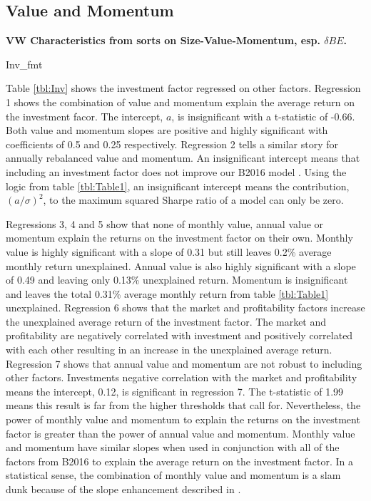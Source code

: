 
\subsection{Value and Momentum}

\textbf{VW Characteristics from sorts on Size-Value-Momentum, esp. $\delta BE$.}

{Inv_fmt}

Table \ref{tbl:Inv} shows the investment factor regressed on other factors. Regression 1
shows the combination of value and momentum explain the average return on the investment
facor. The intercept, $a$, is insignificant with a t-statistic of -0.66. Both value and
momentum slopes are positive and highly significant with coefficients of 0.5 and 0.25
respectively. Regression 2 tells a similar story for annually rebalanced value and
momentum. An insignificant intercept means that including an investment factor does not
improve our B2016 model \parencite{fama1998determining, barillas2016alpha,
fama2016choosing}. Using the logic from table \ref{tbl:Table1}, an insignificant intercept
means the contribution, $(a/\sigma)^2$, to the maximum squared Sharpe ratio of a model can
only be zero.

Regressions 3, 4 and 5 show that none of monthly value, annual value or momentum explain
the returns on the investment factor on their own. Monthly value is highly significant
with a slope of 0.31 but still leaves 0.2\% average monthly return unexplained. Annual
value is also highly significant with a slope of 0.49 and leaving only 0.13\% unexplained
return. Momentum is insignificant and leaves the total 0.31\% average monthly return from
table \ref{tbl:Table1} unexplained. Regression 6 shows that the market and profitability
factors increase the unexplained average return of the investment factor. The market and
profitability are negatively correlated with investment and positively correlated with
each other resulting in an increase in the unexplained average return. Regression 7 shows
that annual value and momentum are not robust to including other factors. Investments
negative correlation with the market and profitability means the intercept, 0.12, is
significant in regression 7. The t-statistic of 1.99 means this result is far from the
higher thresholds that \textcite{harvey2016and} call for. Nevertheless, the power of
monthly value and momentum to explain the returns on the investment factor is greater than
the power of annual value and momentum. Monthly value and momentum have similar slopes
when used in conjunction with all of the factors from B2016 to explain the average return
on the investment factor. In a statistical sense, the combination of monthly value and
momentum is a slam dunk because of the slope enhancement described in
\textcite{fama2015incremental}.

